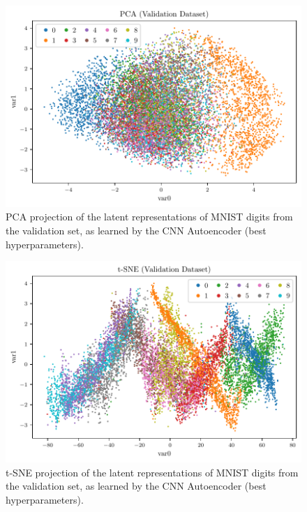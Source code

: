 \documentclass[11pt,a4paper]{scrartcl}
\begin{document}
\begin{figure}[htp]
    \centering
    \includegraphics[width=.9\textwidth]{../Code/Plots/best_hyperparams_PCA}
    \caption{PCA projection of the latent representations of MNIST digits from the validation set, as learned by the CNN Autoencoder (best hyperparameters).\label{fig:best_pca}}
\end{figure}

\begin{figure}[htp]
    \centering
    \includegraphics[width=.9\textwidth]{../Code/Plots/best_hyperparams_tSNE}
    \caption{t-SNE projection of the latent representations of MNIST digits from the validation set, as learned by the CNN Autoencoder (best hyperparameters).\label{fig:best_tSNE}}
\end{figure}
\end{document}
